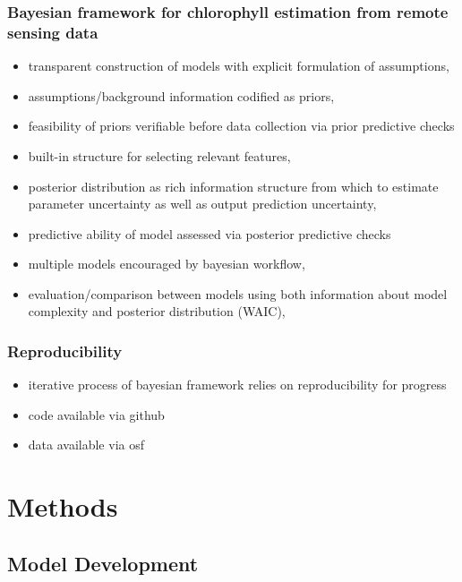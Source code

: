 \documentclass[10pt]{article}
\begin{document}
		\subsubsection{Bayesian framework for chlorophyll estimation from remote sensing data}
			\begin{itemize}
				\item transparent construction of models with explicit formulation of assumptions,
				\item assumptions/background information codified as priors,
				\item feasibility of priors verifiable before data collection via prior predictive checks
				\item built-in structure for selecting relevant features,
				\item posterior distribution as rich information structure from which to estimate parameter uncertainty as well as output prediction uncertainty,
				\item predictive ability of model assessed via posterior predictive checks
				\item multiple models encouraged by bayesian workflow,
				\item evaluation/comparison between models using both information about model complexity and posterior distribution (WAIC),
			\end{itemize}
		\subsubsection{Reproducibility}
			\begin{itemize}
				\item iterative process of bayesian framework relies on reproducibility for progress
				\item code available via github
				\item data available via osf
			\end{itemize}

\section{Methods}
	\subsection{Model Development}		
	\
\end{document}

